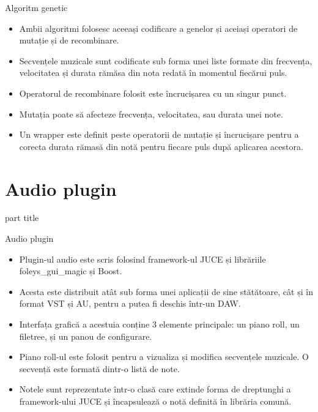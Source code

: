 \documentclass{beamer}
\begin{document}
\begin{frame}{Algoritm genetic}
\begin{itemize}
    \item Ambii algoritmi folosesc aceeași codificare a genelor și aceiași operatori de mutație și de recombinare.
    \item Secvențele muzicale sunt codificate sub forma unei liste formate din frecvența, velocitatea și durata rămăsa din nota redată în momentul fiecărui puls.
    \item Operatorul de recombinare folosit este încrucișarea cu un singur punct.
    \item Mutația poate să afecteze frecvența, velocitatea, sau durata unei note.
    \item Un wrapper este definit peste operatorii de mutație și încrucișare pentru a corecta durata rămasă din notă pentru fiecare puls după aplicarea acestora.
\end{itemize}
\end{frame}

\section{Audio plugin}
\begin{frame}
    \begin{centering}
        \begin{beamercolorbox}[sep=12pt,center,rounded=true]{part title}
            \insertsection\par
        \end{beamercolorbox}
    \end{centering}
\end{frame}

\begin{frame}{Audio plugin}
    \begin{itemize}
        \item Plugin-ul audio este scris folosind framework-ul JUCE și librăriile foleys\_gui\_magic și Boost.
        \item Acesta este distribuit atât sub forma unei aplicații de sine stătătoare, cât și în format VST și AU, pentru a putea fi deschis într-un DAW.
        \item Interfața grafică a acestuia conține 3 elemente principale: un piano roll, un filetree, și un panou de configurare.
        \item Piano roll-ul este folosit pentru a vizualiza și modifica secvențele muzicale. O secvență este formată dintr-o listă de note.
        \item Notele sunt reprezentate într-o clasă care extinde forma de dreptunghi a framework-ului JUCE și încapsulează o notă definită în librăria comună.
    \end{itemize}
\end{frame}
\end{document}
